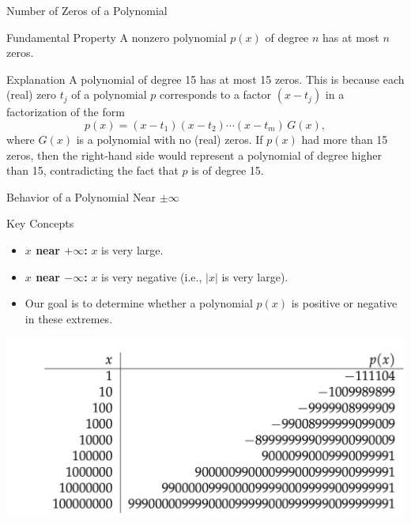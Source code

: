 \documentclass{beamer}
\begin{document}
\begin{frame}{Number of Zeros of a Polynomial}
  \begin{block}{Fundamental Property}
    A nonzero polynomial \(p(x)\) of degree \(n\) has at most \(n\) zeros.
  \end{block}

  \begin{block}{Explanation}
    A polynomial of degree 15 has at most 15 zeros. This is because each (real) zero \(t_j\) of a polynomial \(p\) corresponds to a factor \((x-t_j)\) in a factorization of the form
    \[
      p(x) = (x-t_1)(x-t_2)\cdots(x-t_m) \, G(x),
    \]
    where \(G(x)\) is a polynomial with no (real) zeros. If \(p(x)\) had more than 15 zeros, then the right-hand side would represent a polynomial of degree higher than 15, contradicting the fact that \(p\) is of degree 15.
  \end{block}
\end{frame}


\begin{frame}{Behavior of a Polynomial Near \(\pm\infty\)}
  \begin{block}{Key Concepts}
    \begin{itemize}
      \item \textbf{\(x\) near \(+\infty\):} \(x\) is very large.
      \item \textbf{\(x\) near \(-\infty\):} \(x\) is very negative (i.e., \(|x|\) is very large).
      \item Our goal is to determine whether a polynomial \(p(x)\) is positive or negative in these extremes.
    \end{itemize}
  \end{block}
\end{frame}

\begin{frame}
  \centering
  \includegraphics[scale=0.2]{at-infty.png}


\end{frame}
 
\end{document}
